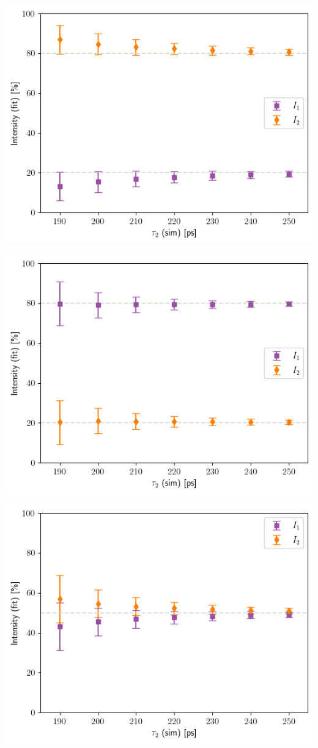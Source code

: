 \begin{minipage}{ .47\linewidth}
    \includegraphics[width=\linewidth]{Batch 3/regular IRF/tau1 150/output/plotfin/2080.png}
    \label{fig:150-2080}
\end{minipage}
\hfill
\begin{minipage}{ .47\linewidth}
    \includegraphics[width=\linewidth]{Batch 3/regular IRF/tau1 150/output/plotfin/8020.png}
    \label{fig:150-8020}
\end{minipage}
\begin{minipage}{\linewidth}
    \includegraphics[width= .47\linewidth]{Batch 3/regular IRF/tau1 150/output/plotfin/5050.png}
    \label{fig:150-5050}
\end{minipage}

